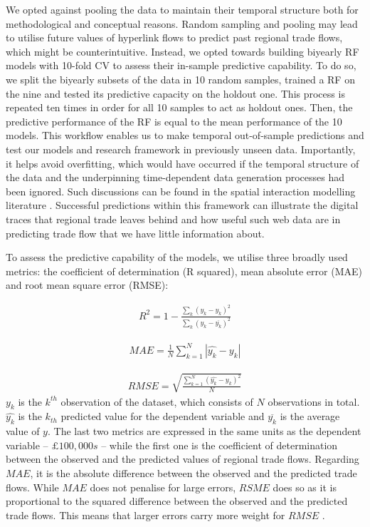 \documentclass[]{interact}
\theoremstyle{plain}%
\theoremstyle{definition}
\theoremstyle{remark}
\begin{document}
We opted against pooling the data to maintain their temporal structure
both for methodological and conceptual reasons. Random sampling and
pooling may lead to utilise future values of hyperlink flows to predict
past regional trade flows, which might be counterintuitive. Instead, we
opted towards building biyearly RF models with 10-fold CV to assess
their in-sample predictive capability. To do so, we split the biyearly
subsets of the data in 10 random samples, trained a RF on the nine and
tested its predictive capacity on the holdout one. This process is
repeated ten times in order for all 10 samples to act as holdout ones.
Then, the predictive performance of the RF is equal to the mean
performance of the 10 models. This workflow enables us to make temporal
out-of-sample predictions and test our models and research framework in
previously unseen data. Importantly, it helps avoid overfitting, which
would have occurred if the temporal structure of the data and the
underpinning time-dependent data generation processes had been ignored.
Such discussions can be found in the spatial interaction modelling
literature
\citep{mikkonen1999parameters, mozolin2000trip, oshan2020potential}.
Successful predictions within this framework can illustrate the digital
traces that regional trade leaves behind and how useful such web data
are in predicting trade flow that we have little information about.

To assess the predictive capability of the models, we utilise three
broadly used metrics: the coefficient of determination (R squared), mean
absolute error (MAE) and root mean square error (RMSE):

\begin{align}
R^2 = 1 - \frac{\sum_{k} (y_{k} - \hat{y_{k}})^2} {\sum_{k} (y_{k} - \overline{y_{k}})^2} \label{eq:rsquared}
\end{align}

\begin{align}
MAE = \frac{1}{N} \sum_{k = 1}^{N} |\hat{y_{k}} - y_{k}| \label{eq:mae}
\end{align}

\begin{align}
RMSE =  \sqrt{\frac{\sum_{k = 1}^{N} (\hat{y_{k}} - y_{k})^2} {N}} \label{eq:rmse}
\end{align} \(y_{k}\) is the \(k^{th}\) observation of the dataset,
which consists of \(N\) observations in total. \(\hat{y_{k}}\) is the
\(k_{th}\) predicted value for the dependent variable and
\(\overline{y_{k}}\) is the average value of \(y\). The last two metrics
are expressed in the same units as the dependent variable --
\(\pounds 100,000s\) -- while the first one is the coefficient of
determination between the observed and the predicted values of regional
trade flows. Regarding \(MAE\), it is the absolute difference between
the observed and the predicted trade flows. While \(MAE\) does not
penalise for large errors, \(RSME\) does so as it is proportional to the
squared difference between the observed and the predicted trade flows.
This means that larger errors carry more weight for \(RMSE\)
\citep{pontius2008components}.
\end{document}
